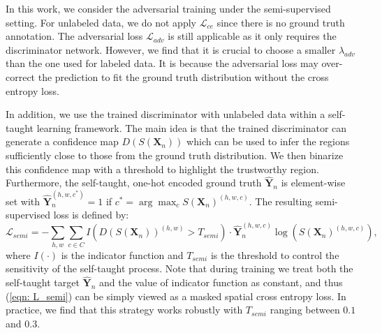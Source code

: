 \documentclass{bmvc2k}
\begin{document}
	\vspace{-2mm}{\flushleft \bf Training with unlabeled data.}
	In this work, we consider the adversarial training under the semi-supervised setting.
	For unlabeled data, we do not apply $\mathcal{L}_{ce}$ since there is no ground truth annotation.
	The adversarial loss $\mathcal{L}_{adv}$ is still applicable as it only requires the discriminator network.
	However, we find that it is crucial to choose a smaller $\lambda_{adv}$ than the one 
	used for labeled data.
	It is because the adversarial loss may over-correct the prediction to fit the ground truth distribution without the cross entropy loss.
	
	In addition, we use the trained discriminator with unlabeled data within a  
	self-taught learning framework.
	The main idea is that the trained discriminator can generate a confidence 
	map $D(S(\mathbf{X}_n))$ which can be used to infer the regions 
	sufficiently close to those from the ground truth distribution.
	We then binarize this confidence map with a threshold to highlight the trustworthy region. %
	Furthermore, the self-taught, one-hot encoded ground truth $\mathbf{\hat{Y}}_n$ is element-wise set with $\mathbf{\hat{Y}}_n^{(h,w,c^*)} = 1$ if $c^* = \arg \max_cS(\mathbf{X}_n)^{(h,w,c)}.$
	The resulting semi-supervised loss is defined by:
	\begin{equation}
		\label{eqn: L_semi}
		\mathcal{L}_{semi} = - \sum_{h,w}{} \sum_{c \in C}{} I(D(S(\mathbf{X}_n))^{(h,w)} > T_{semi}) \cdot \mathbf{\hat{Y}}_n^{(h,w,c)} \log(S(\mathbf{X}_n)^{(h,w,c)}),
	\end{equation}
	where $I(\cdot)$ is the indicator function and $T_{semi}$ is the threshold to control the sensitivity of the self-taught process.
	Note that during training we treat both the self-taught target $\mathbf{\hat{Y}}_n$ and the value of indicator function as constant, and thus (\ref{eqn: L_semi}) can be simply viewed as a masked spatial cross entropy loss.
	In practice, we find that this strategy works robustly with $T_{semi}$ ranging between $0.1$ and $0.3$.
	
	
	\vspace{-3mm}
\end{document}
